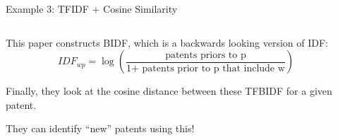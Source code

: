 \documentclass[notes,11pt, aspectratio=169]{beamer}
\newenvironment{wideitemize}{\itemize\addtolength{\itemsep}{10pt}}{\enditemize}
\begin{document}
  \begin{frame}{Example 3: TFIDF + Cosine Similarity}
    \begin{columns}[onlytextwidth, T] %
      \begin{column}{.5\textwidth}
        \begin{wideitemize}
        \item This paper constructs BIDF, which is a backwards looking version of IDF:
          \begin{equation}
            IDF_{wp} = \log\left(\frac{\text{patents priors to p}}{\text{1+ patents prior to p that include w}}\right)
          \end{equation}
        \item Finally, they look at the cosine distance between these TFBIDF for a given patent.
          \item They can identify ``new'' patents using this!
        \end{wideitemize}
      \end{column}%
      \hfill%
      \begin{column}{.5\textwidth}
      \end{column}%
    \end{columns}
  \end{frame}

  
  
\end{document}
